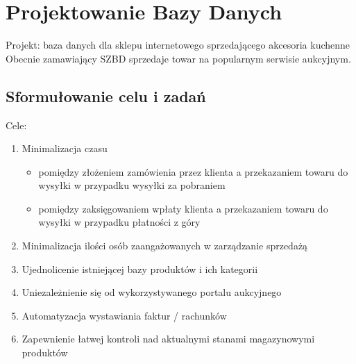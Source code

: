 \chapter{Projektowanie Bazy Danych}
Projekt: baza danych dla sklepu internetowego sprzedającego akcesoria kuchenne\\
Obecnie zamawiający SZBD sprzedaje towar na popularnym serwisie aukcyjnym.\\ 
\section{Sformułowanie celu i zadań}
Cele:
\begin{enumerate}
\item Minimalizacja czasu
\begin{itemize}
\item pomiędzy złożeniem zamówienia przez klienta a przekazaniem towaru do wysyłki w przypadku wysyłki za pobraniem
\item pomiędzy zaksięgowaniem wpłaty klienta a przekazaniem towaru do wysyłki w przypadku płatności z góry 
\end{itemize} 
\item Minimalizacja ilości osób zaangażowanych w zarządzanie sprzedażą
\item Ujednolicenie istniejącej bazy produktów i ich kategorii
\item Uniezależnienie się od wykorzystywanego portalu aukcyjnego
\item Automatyzacja wystawiania faktur / rachunków
\item Zapewnienie łatwej kontroli nad aktualnymi stanami magazynowymi produktów 
\end{enumerate}


